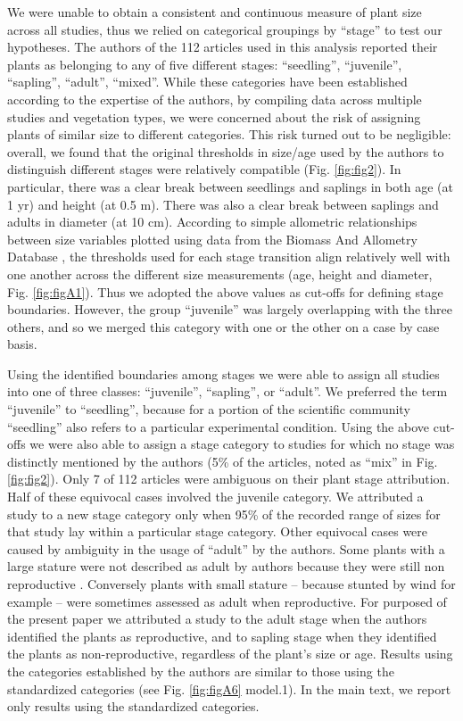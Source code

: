 \documentclass[a4paper,11pt]{article}
\begin{document}
We were unable to obtain a consistent and continuous measure of plant size across all studies, thus we relied on categorical groupings by ``stage'' to test our hypotheses. The authors of the 112 articles used in this analysis reported their plants as belonging to any of five different stages: ``seedling'', ``juvenile'', ``sapling'', ``adult'', ``mixed''. While these categories have been established according to the expertise of the authors, by compiling data across multiple studies and vegetation types, we were concerned about the risk of assigning plants of similar size to different categories. This risk turned out to be negligible: overall, we found that the original thresholds in size/age used by the authors to distinguish different stages were relatively compatible (Fig. \ref{fig:fig2}). In particular, there was a clear break between seedlings and saplings in both age (at 1 yr) and height (at 0.5 m). There was also a clear break between saplings and adults in diameter (at 10 cm). According to simple allometric relationships between size variables plotted using data from the Biomass And Allometry Database \citep{Falster:2015}, the thresholds used for each stage transition align relatively well with one another across the different size measurements (age, height and diameter, Fig. \ref{fig:figA1}). Thus we adopted the above values as cut-offs for defining stage boundaries. However, the group ``juvenile'' was largely overlapping with the three others, and so we merged this category with one or the other on a case by case basis.

Using the identified boundaries among stages we were able to assign all studies into one of three classes: ``juvenile'', ``sapling'', or ``adult''.  We preferred the term ``juvenile'' to ``seedling'', because for a portion of the scientific community ``seedling'' also refers to a particular experimental condition. Using the above cut-offs we were also able to assign a stage category to studies for which no stage was distinctly mentioned by the authors (5\% of the articles, noted as ``mix'' in Fig. \ref{fig:fig2}). Only 7 of 112 articles were ambiguous on their plant stage attribution. Half of these equivocal cases involved the juvenile category. We attributed a study to a new stage category only when 95\% of the recorded range of sizes for that study lay within a particular stage category. Other equivocal cases were caused by ambiguity in the usage of ``adult'' by the authors. Some plants with a large stature were not described as adult by authors because they were still non reproductive \citep{King:2006dg,King:2006he}. Conversely plants with small stature -- because stunted by wind for example \citep{Stratton:2001ck}-- were sometimes assessed as adult when reproductive. For purposed of the present paper we attributed a study to the adult stage when the authors identified the plants as reproductive, and to sapling stage when they identified the plants as non-reproductive, regardless of the plant's size or age. Results using the categories established by the authors are similar to those using the standardized categories (see Fig. \ref{fig:figA6} model.1). In the main text, we report only results using the standardized categories.
\end{document}
